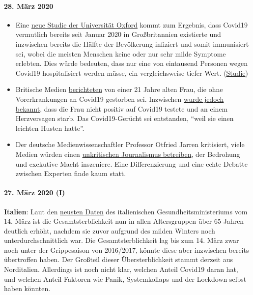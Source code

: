 \hypertarget{28-muxe4rz-2020}{%
\paragraph{28. März 2020}\label{28-muxe4rz-2020}}

\begin{itemize}
\tightlist
\item
  Eine
  \href{https://news.yahoo.com/oxford-study-suggests-millions-people-221100162.html}{neue
  Studie der Universität Oxford} kommt zum Ergebnis, dass Covid19
  vermutlich bereits seit Januar 2020 in Großbritannien existierte und
  inzwischen bereits die Hälfte der Bevölkerung infiziert und somit
  immunisiert sei, wobei die meisten Menschen keine oder nur sehr milde
  Symptome erlebten. Dies würde bedeuten, dass nur eine von eintausend
  Personen wegen Covid19 hospitalisiert werden müsse, ein
  vergleichsweise tiefer Wert.
  (\href{https://www.medrxiv.org/content/10.1101/2020.03.24.20042291v1}{Studie})
\item
  Britische Medien
  \href{https://www.bbc.com/news/uk-england-beds-bucks-herts-52041709}{berichteten}
  von einer 21 Jahre alten Frau, die ohne Vorerkrankungen an Covid19
  gestorben sei. Inzwischen
  \href{https://archive.is/20200329015127/https://www.theguardian.com/world/2020/mar/27/chloe-middleton-death-21-year-old-not-recorded-nhs-covid-19-related}{wurde
  jedoch bekannt}, dass die Frau nicht positiv auf Covid19 testete und
  an einem Herzversagen starb. Das Covid19-Gerücht sei entstanden,
  ``weil sie einen leichten Husten hatte''.
\item
  Der deutsche Medienwissenschaftler Professor Otfried Jarren
  kritisiert, viele Medien würden einen
  \href{https://www.deutschlandfunk.de/covid-19-scharfe-kritik-an-ard-und-zdf-wegen.2849.de.html?drn:news_id=1117133}{unkritischen
  Journalismus betreiben}, der Bedrohung und exekutive Macht inszeniere.
  Eine Differenzierung und eine echte Debatte zwischen Experten finde
  kaum statt.
\end{itemize}

\hypertarget{27-muxe4rz-2020-i}{%
\paragraph{27. März 2020 (I)}\label{27-muxe4rz-2020-i}}

\textbf{Italien}: Laut den
\href{http://www.salute.gov.it/portale/caldo/SISMG_sintesi_ULTIMO.pdf}{neusten
Daten} des italienischen Gesundheitsministeriums vom 14. März ist die
Gesamtsterblichkeit nun in allen Altersgruppen über 65 Jahren deutlich
erhöht, nachdem sie zuvor aufgrund des milden Winters noch
unterdurchschnittlich war. Die Gesamtsterblichkeit lag bis zum 14. März
zwar noch unter der Grippesaison von 2016/2017, könnte diese aber
inzwischen bereits übertroffen haben. Der Großteil dieser
Übersterblichkeit stammt derzeit aus Norditalien. Allerdings ist noch
nicht klar, welchen Anteil Covid19 daran hat, und welchen Anteil
Faktoren wie Panik, Systemkollaps und der Lockdown selbst haben könnten.

